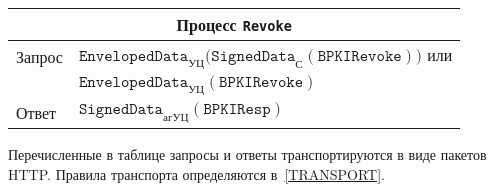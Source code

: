 \begin{table}[bht]
\begin{tabular}{|l|l|}
\hline                                     
\hline
\multicolumn{2}{|c|}{Процесс \texttt{Revoke}}\\
\hline
\hline
\rule{0pt}{15pt}
Запрос &
$\texttt{EnvelopedData}_{\text{УЦ}}
\bigl(\texttt{SignedData}_{\text{С}}(\texttt{BPKIRevoke})\bigr)$ или\\
&
$\texttt{EnvelopedData}_{\text{УЦ}}(\texttt{BPKIRevoke})$\\[3pt]
\hline                                      
%
\rule{0pt}{15pt}
Ответ &
$\texttt{SignedData}_{\text{агУЦ}}(\texttt{BPKIResp})$\\[3pt]
\hline                                     
\end{tabular}
\end{table}

Перечисленные в таблице запросы и ответы транспортируются в виде пакетов 
HTTP. Правила транспорта определяются в~\ref{TRANSPORT}.


